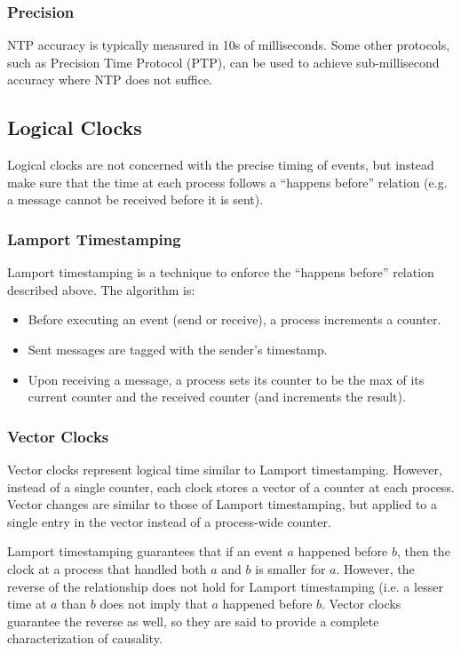 \documentclass[12pt,titlepage]{article}
\begin{document}
      \subsubsection{Precision}
        NTP accuracy is typically measured in 10s of milliseconds. Some other protocols, such as Precision Time Protocol (PTP), can be used to achieve
        sub-millisecond accuracy where NTP does not suffice.

    \subsection{Logical Clocks}
      Logical clocks are not concerned with the precise timing of events, but instead make sure that the time at each process follows a ``happens before''
      relation (e.g. a message cannot be received before it is sent).

      \subsubsection{Lamport Timestamping}
        Lamport timestamping is a technique to enforce the ``happens before'' relation described above. The algorithm is:
        \begin{itemize}
          \item Before executing an event (send or receive), a process increments a counter.
          \item Sent messages are tagged with the sender's timestamp.
          \item Upon receiving a message, a process sets its counter to be the max of its current counter and the received counter (and increments the result).
        \end{itemize}

      \subsubsection{Vector Clocks}
        Vector clocks represent logical time similar to Lamport timestamping. However, instead of a single counter, each clock stores a vector of a counter at each
        process. Vector changes are similar to those of Lamport timestamping, but applied to a single entry in the vector instead of a process-wide counter.

        Lamport timestamping guarantees that if an event $a$ happened before $b$, then the clock at a process that handled both $a$ and $b$ is smaller for $a$.
        However, the reverse of the relationship does not hold for Lamport timestamping (i.e. a lesser time at $a$ than $b$ does not imply that $a$ happened
        before $b$. Vector clocks guarantee the reverse as well, so they are said to provide a complete characterization of causality.
\end{document}
